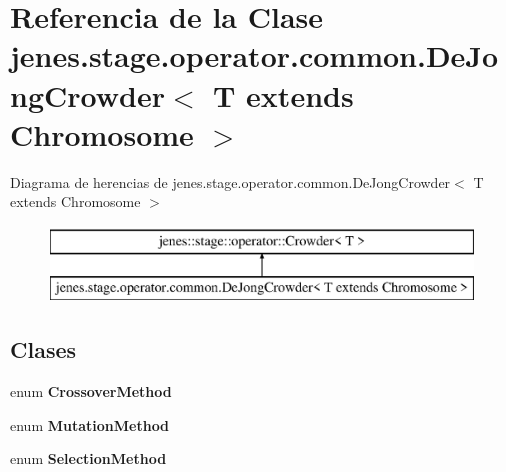 \hypertarget{classjenes_1_1stage_1_1operator_1_1common_1_1_de_jong_crowder_3_01_t_01extends_01_chromosome_01_4}{\section{Referencia de la Clase jenes.\-stage.\-operator.\-common.\-De\-Jong\-Crowder$<$ T extends Chromosome $>$}
\label{classjenes_1_1stage_1_1operator_1_1common_1_1_de_jong_crowder_3_01_t_01extends_01_chromosome_01_4}
}
Diagrama de herencias de jenes.\-stage.\-operator.\-common.\-De\-Jong\-Crowder$<$ T extends Chromosome $>$\begin{figure}[H]
\begin{center}
\leavevmode
\includegraphics[height=2.000000cm]{classjenes_1_1stage_1_1operator_1_1common_1_1_de_jong_crowder_3_01_t_01extends_01_chromosome_01_4}
\end{center}
\end{figure}
\subsection*{Clases}
\begin{DoxyCompactItemize}
\item 
enum {\bfseries Crossover\-Method}
\item 
enum {\bfseries Mutation\-Method}
\item 
enum {\bfseries Selection\-Method}
\end{DoxyCompactItemize}
